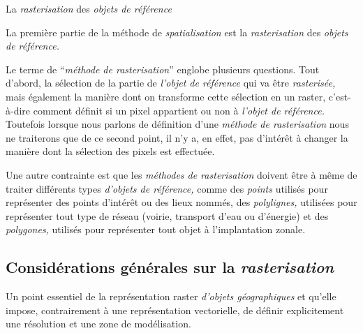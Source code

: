 La \emph{rasterisation} des \emph{objets de référence}

La première partie de la méthode de \emph{spatialisation} est la
\emph{rasterisation} des \emph{objets de référence.}

Le terme de \enquote{\emph{méthode de rasterisation}} englobe
plusieurs questions. Tout d'abord, la sélection de la partie de
\emph{l'objet de référence} qui va être \emph{rasterisée,} mais
également la manière dont on transforme cette sélection en un raster,
c'est-à-dire comment définit si un pixel appartient ou non à
\emph{l'objet de référence.} Toutefois lorsque nous parlons de
définition d'une \emph{méthode de rasterisation} nous ne traiterons
que de ce second point, il n'y a, en effet, pas d’intérêt à changer la
manière dont la sélection des pixels est effectuée.

Une autre contrainte est que les \emph{méthodes de rasterisation}
doivent être à même de traiter différents types \emph{d'objets de
  référence,} comme des \emph{points} utilisés pour représenter des
points d’intérêt ou des lieux nommés, des \emph{polylignes,} utilisées
pour représenter tout type de réseau (\eg voirie, transport d'eau ou
d'énergie) et des \emph{polygones,} utilisés pour représenter tout
objet à l’implantation zonale.

\subsection{Considérations générales sur la \emph{rasterisation}}

Un point essentiel de la représentation raster \emph{d'objets
  géographiques} et qu'elle impose, contrairement à une représentation
vectorielle, de définir explicitement une résolution et une zone de
modélisation.


